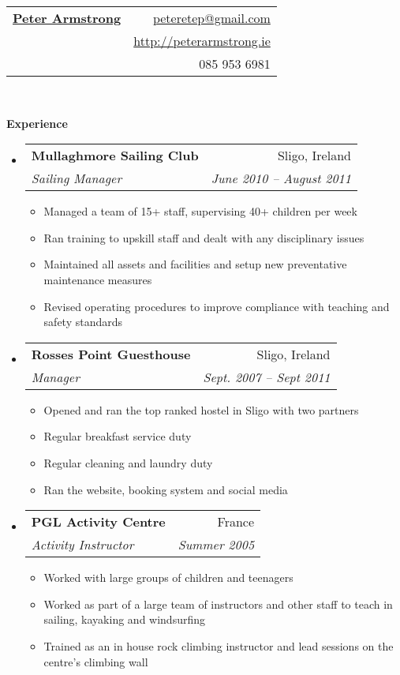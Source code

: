 \documentclass[letterpaper,11pt]{article}
\makeatletter
\newcommand{\resitem}[1]{\item #1 \vspace{-2pt}}
\newcommand{\resheading}[1]{{\large \colorbox{mygrey}{\begin{minipage}{\textwidth}{\textbf{#1 \vphantom{p\^{E}}}}\end{minipage}}}}
\newcommand{\ressubheading}[4]{
\begin{tabular*}{6.5in}{l@{\extracolsep{\fill}}r}
		\textbf{#1} & #2 \\
		\textit{#3} & \textit{#4} \\
\end{tabular*}\vspace{-6pt}}
\makeatother
\begin{document}
\newcommand{\mywebheader}{
\begin{tabular*}{7in}{l@{\extracolsep{\fill}}r}
	\textbf{\href{http://www.peterarmstrong.ie/}{\LARGE Peter Armstrong}} & \href{mailto:peteretep@gmail.com}{peteretep@gmail.com}\\
	& \href{http://www.peterarmstrong.ie}{http://peterarmstrong.ie} \\ & 085 953 6981
	\end{tabular*}
\\
\vspace{0.1in}}

\mywebheader


\resheading{Experience}
	\begin{itemize}        
    \item
        \ressubheading{Mullaghmore Sailing Club}{Sligo, Ireland}{Sailing Manager}{June 2010 -- August 2011}
        {
        \begin{itemize}
        \resitem{Managed a team of 15+ staff, supervising 40+ children per week}
        \resitem{Ran training to upskill staff and dealt with any disciplinary issues}
        \resitem{Maintained all assets and facilities and setup new preventative maintenance measures}
        \resitem{Revised operating procedures to improve compliance with teaching and safety standards}
        \end{itemize}
        }
        
		  \item 
      \ressubheading{Rosses Point Guesthouse}{Sligo, Ireland}{Manager}{Sept. 2007 -- Sept 2011}
        {
        \begin{itemize}
      	  \resitem{Opened and ran the top ranked hostel in Sligo with two partners}
          \resitem{Regular breakfast service duty}
          \resitem{Regular cleaning and laundry duty}
          \resitem{Ran the website, booking system and social media}
        \end{itemize}
        }
        
      \item
      \ressubheading{PGL Activity Centre}{France}{Activity Instructor}{Summer 2005}
      {
        \begin{itemize}
        \resitem{Worked with large groups of children and teenagers}
        \resitem{Worked as part of a large team of instructors and other staff to teach in sailing, kayaking and windsurfing}
        \resitem{Trained as an in house rock climbing instructor and lead sessions on the centre's climbing wall}
        \end{itemize}
      }

	\end{itemize}  %
\end{document}
